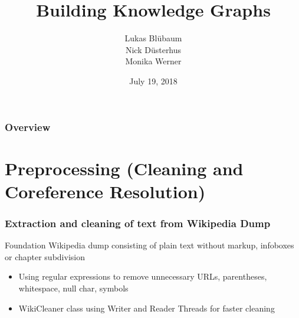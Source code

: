 \documentclass{beamer}
\title[BKG]{Building Knowledge Graphs} %
\author[Data Science]{Lukas Bl{\"u}baum \\ Nick D{\"u}sterhus \\ Monika Werner} %
\institute[UPB] %
{
University of Paderborn \\ %
\medskip
\textit{https://github.com/LukasBluebaum/BKG} %
}
\date{July 19, 2018} %
\begin{document}
\begin{frame}
\titlepage %
\end{frame}

\begin{frame}
\frametitle{Overview} %
\tableofcontents %
\end{frame}


\section{Preprocessing (Cleaning and Coreference Resolution)} %

\begin{frame}
\frametitle{Extraction and cleaning of text from Wikipedia Dump}
\begin{block}{Foundation}
	Wikipedia dump consisting of plain text without markup, infoboxes or chapter subdivision 
\end{block}
\begin{itemize}
	\item Using regular expressions to remove unnecessary URLs, parentheses, whitespace, null char, symbols
	\item WikiCleaner class using Writer and Reader Threads for faster cleaning
\end{itemize}
\end{frame}

\end{document}
